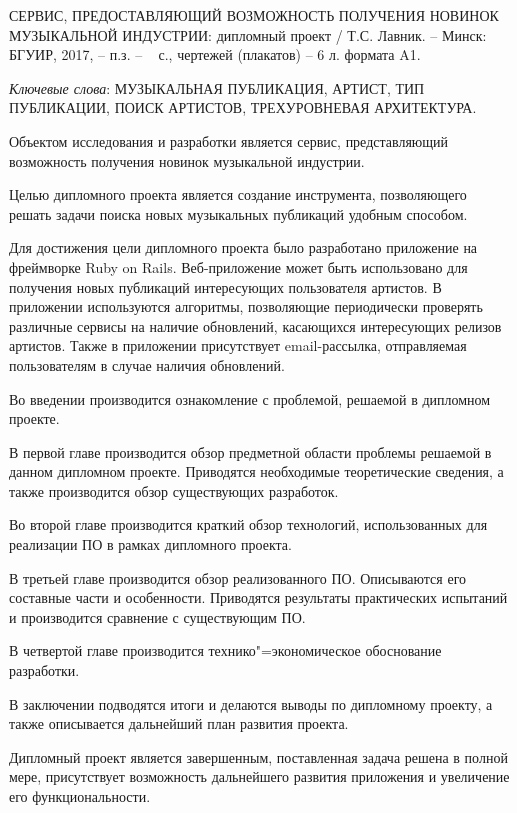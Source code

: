 \thispagestyle{empty}

\begin{center}
  \begin{minipage}{0.90\textwidth}
    СЕРВИС, ПРЕДОСТАВЛЯЮЩИЙ ВОЗМОЖНОСТЬ ПОЛУЧЕНИЯ НОВИНОК МУЗЫКАЛЬНОЙ ИНДУСТРИИ: дипломный проект / Т.С. Лавник. -- Минск: БГУИР, 2017, -- п.з. -- ~\pageref*{LastPage} с., чертежей (плакатов) -- 6 л. формата A1.
  \end{minipage}
\end{center}

\emph{Ключевые слова}: МУЗЫКАЛЬНАЯ ПУБЛИКАЦИЯ, АРТИСТ, ТИП ПУБЛИКАЦИИ, ПОИСК АРТИСТОВ, ТРЕХУРОВНЕВАЯ АРХИТЕКТУРА.

Объектом исследования и разработки является сервис, представляющий возможность получения новинок музыкальной индустрии.

Целью дипломного проекта является создание инструмента, позволяющего решать задачи поиска новых музыкальных публикаций удобным способом.

Для достижения цели дипломного проекта было разработано приложение на фреймворке Ruby on Rails.
Веб-приложение может быть использовано для получения новых публикаций интересующих пользователя артистов.
В приложении используются алгоритмы, позволяющие периодически проверять различные сервисы на наличие обновлений, касающихся интересующих релизов артистов. Также в приложении присутствует email-рассылка, отправляемая пользователям в случае наличия обновлений.

Во введении производится ознакомление с проблемой, решаемой в дипломном проекте.

В первой главе производится обзор предметной области проблемы решаемой в данном дипломном проекте.
Приводятся необходимые теоретические сведения, а также производится обзор существующих разработок.

Во второй главе производится краткий обзор технологий, использованных для реализации ПО в рамках дипломного проекта.

В третьей главе производится обзор реализованного ПО.
Описываются его составные части и особенности.
Приводятся результаты практических испытаний и производится сравнение с существующим ПО.

В четвертой главе производится технико"=экономическое обоснование разработки.

В заключении подводятся итоги и делаются выводы по дипломному проекту, а также описывается дальнейший план развития проекта.

Дипломный проект является завершенным, поставленная задача решена в полной мере, присутствует возможность дальнейшего развития приложения и увеличение его функциональности.

\clearpage
